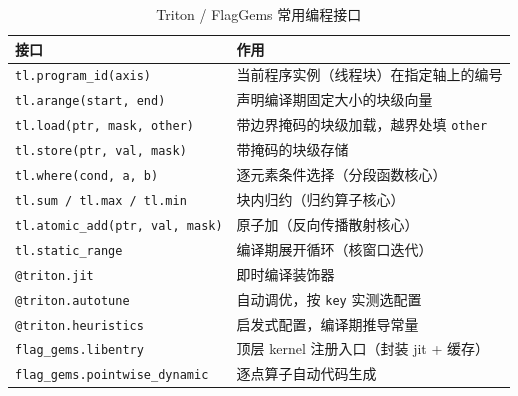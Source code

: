 \begin{table}[!htbp]
\centering\small
\caption{Triton / FlagGems 常用编程接口}
\label{tab:api}
\renewcommand{\arraystretch}{1.12}
\begin{tabularx}{\textwidth}{lX}
\toprule
接口 & 作用 \\
\midrule
\texttt{tl.program\_id(axis)} & 当前程序实例（线程块）在指定轴上的编号 \\
\texttt{tl.arange(start, end)} & 声明编译期固定大小的块级向量 \\
\texttt{tl.load(ptr, mask, other)} & 带边界掩码的块级加载，越界处填 \texttt{other} \\
\texttt{tl.store(ptr, val, mask)} & 带掩码的块级存储 \\
\texttt{tl.where(cond, a, b)} & 逐元素条件选择（分段函数核心） \\
\texttt{tl.sum / tl.max / tl.min} & 块内归约（归约算子核心） \\
\texttt{tl.atomic\_add(ptr, val, mask)} & 原子加（反向传播散射核心） \\
\texttt{tl.static\_range} & 编译期展开循环（核窗口迭代） \\
\texttt{@triton.jit} & 即时编译装饰器 \\
\texttt{@triton.autotune} & 自动调优，按 \texttt{key} 实测选配置 \\
\texttt{@triton.heuristics} & 启发式配置，编译期推导常量 \\
\texttt{flag\_gems.libentry} & 顶层 kernel 注册入口（封装 jit + 缓存） \\
\texttt{flag\_gems.pointwise\_dynamic} & 逐点算子自动代码生成 \\
\bottomrule
\end{tabularx}
\end{table}

